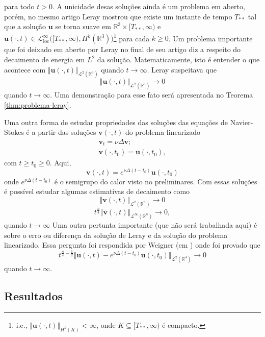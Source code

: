 \documentclass[a4paper, 11pt]{book}
\theoremstyle{definition}
\newcommand{\bR}{\mathbb{R}}
\newcommand{\bu}{\mathbf{u}}
\newcommand{\bv}{\mathbf{v}}
\newcommand{\cL}{\mathcal{L}}
\newcommand{\loc}{\mathrm{loc}}
\begin{document}
para todo $t > 0$.
A unicidade desas soluções ainda é um problema em aberto, porém, no mesmo artigo Leray mostrou que existe um instante de tempo $T_{**}$ tal que a solução $\bu$ se torna suave em $\bR^3 \times [T_{**}, \infty)$ e $\bu(\cdot,t) \in \cL^{\infty}_{\loc}\big( [T_{**}, \infty), H^k(\bR^3) \big)$\footnote{i.e., $\Vert \bu(\cdot,t) \Vert_{H^k(K)} < \infty$, onde $K \subseteq [T_{**},\infty)$ é compacto.} para cada $k \geqslant 0$.
Um problema importante que foi deixado em aberto por Leray no final de seu artigo diz a respeito do decaimento de energia em $L^2$ da solução. Matematicamente, isto é entender o que acontece com $\Vert \bu(\cdot,t) \Vert_{\cL^2(\bR^3)}$ quando $t \to \infty$. Leray suspeitava que
\[
    \Vert \bu(\cdot,t) \Vert_{\cL^2(\bR^3)} \to 0
\]
quando $t \to \infty$. Uma demonstração para esse fato será apresentada no Teorema \ref{thm:problema-leray}.

Uma outra forma de estudar propriedades das soluções das equações de Navier-Stokes é a partir das soluções $\bv(\cdot,t)$ do problema linearizado
\[
    \begin{aligned}
        \bv_t = \nu \Delta \bv;\\
        \bv(\cdot,t_0) = \bu(\cdot,t_0),
    \end{aligned}
\]
com $t \geqslant t_0 \geqslant 0$. Aqui, 
\[
    \bv(\cdot,t) = e^{\nu \Delta (t-t_0)} \bu(\cdot,t_0)
\]
onde $e^{\nu \Delta (t-t_0)}$ é o semigrupo do calor visto no preliminares.
Com essas soluções é possível estudar algumas estimativas de decaimento como
\[
    \Vert \bv(\cdot,t) \Vert_{\cL^2(\bR^n)} \to 0
\]
\[
    t^{\frac{n}{4}}\Vert \bv(\cdot,t) \Vert_{\cL^\infty(\bR^n)} \to 0,
\]
quando $t \to \infty$
Uma outra pertunta importante (que não será trabalhada aqui) é sobre o erro ou diferença da solução de Leray e da solução do problema linearizado.
Essa pergunta foi respondida por Weigner (em \cite{wiegner-decay}) onde foi provado que
\[
    t^{\frac{n}{4} - \frac{1}{2}} \Vert \bu(\cdot,t) - e^{\nu \Delta (t-t_0)} \bu(\cdot,t_0) \Vert_{\cL^2(\bR^3)} \to 0
\]
quando $t \to \infty$.

\subsection{Resultados}
\end{document}
